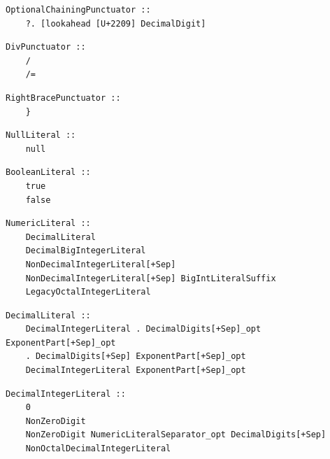 \noindent\textbf{\texttt{}}\par
\begin{lstlisting}
OptionalChainingPunctuator ::
    ?. [lookahead [U+2209] DecimalDigit]
\end{lstlisting}

\noindent\textbf{\texttt{}}\par
\begin{lstlisting}
DivPunctuator ::
    /
    /=
\end{lstlisting}

\noindent\textbf{\texttt{}}\par
\begin{lstlisting}
RightBracePunctuator ::
    }
\end{lstlisting}

\noindent\textbf{\texttt{}}\par
\begin{lstlisting}
NullLiteral ::
    null
\end{lstlisting}

\noindent\textbf{\texttt{}}\par
\begin{lstlisting}
BooleanLiteral ::
    true
    false
\end{lstlisting}

\noindent\textbf{\texttt{}}\par
\begin{lstlisting}
NumericLiteral ::
    DecimalLiteral
    DecimalBigIntegerLiteral
    NonDecimalIntegerLiteral[+Sep]
    NonDecimalIntegerLiteral[+Sep] BigIntLiteralSuffix
    LegacyOctalIntegerLiteral
\end{lstlisting}

\noindent\textbf{\texttt{}}\par
\begin{lstlisting}
DecimalLiteral ::
    DecimalIntegerLiteral . DecimalDigits[+Sep]_opt ExponentPart[+Sep]_opt
    . DecimalDigits[+Sep] ExponentPart[+Sep]_opt
    DecimalIntegerLiteral ExponentPart[+Sep]_opt
\end{lstlisting}

\noindent\textbf{\texttt{}}\par
\begin{lstlisting}
DecimalIntegerLiteral ::
    0
    NonZeroDigit
    NonZeroDigit NumericLiteralSeparator_opt DecimalDigits[+Sep]
    NonOctalDecimalIntegerLiteral
\end{lstlisting}


